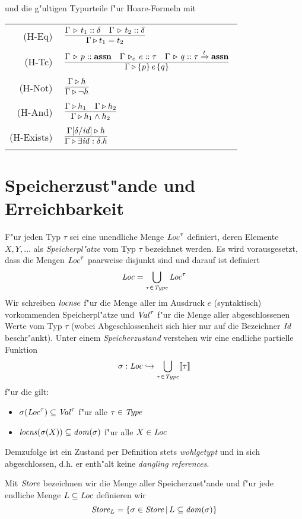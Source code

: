 \documentclass[12pt,a4paper,bigheadings]{scrartcl}
\newcommand{\semantic}[1]{\ensuremath{\llbracket#1\rrbracket}}
\newcommand{\assn}{\ensuremath{\mathbf{assn}}}
\newcommand{\locns}{\name{locns}}
\newcommand{\tto}{\ensuremath{\xrightarrow{t}}}
\newcommand{\RN}[1]{\mbox{{\sc (#1)}}}
\newcommand{\Tje}[3]{#1 \,\tr_e\, #2\cc#3}
\begin{document}
und die g"ultigen Typurteile f"ur Hoare-Formeln mit \\[3mm]
\begin{tabular}{rl}
  \RN{H-Eq} & $\regel{\Tj{\Gamma}{t_1}{\delta} \quad \Tj{\Gamma}{t_2}{\delta}}
                     {\Tjh{\Gamma}{t_1 = t_2}}$ \\[1mm]
  \RN{H-Tc} & $\regel{\Tj{\Gamma}{p}{\assn} \quad \Tje{\Gamma}{e}{\tau} \quad \Tj{\Gamma}{q}{\tau} \tto \assn}
                     {\Tjh{\Gamma}{\triple{p}{e}{q}}}$ \\[1mm]
  \RN{H-Not} & $\regel{\Tjh{\Gamma}{h}}
                      {\Tjh{\Gamma}{\neg h}}$ \\[1mm]
  \RN{H-And} & $\regel{\Tjh{\Gamma}{h_1} \quad \Tjh{\Gamma}{h_2}}
                      {\Tjh{\Gamma}{h_1 \wedge h_2}}$ \\[1mm]
  \RN{H-Exists} & $\regel{\Tjh{\Gamma[\delta/\id]}{h}}
                         {\Tjh{\Gamma}{\exists \id:\delta.h}}$
\end{tabular}


\section{Speicherzust"ande und Erreichbarkeit}

F"ur jeden Typ $\tau$ sei eine unendliche Menge ${\text{\it Loc\/}}^\tau$ definiert, deren Elemente $X,Y,\ldots$
als {\em Speicherpl"atze} vom Typ $\tau$ bezeichnet werden. Es wird vorausgesetzt, dass die Mengen
${\text{\it Loc\/}}^\tau$ paarweise disjunkt sind und darauf ist definiert
\[
  {\text{\it Loc\/}} = \bigcup_{\tau\in{\text{\it Type\/}}} {\text{\it Loc\/}}^\tau
\]
Wir schreiben $\locns{e}$ f"ur die Menge aller im Ausdruck $e$ (syntaktisch) vorkommenden Speicherpl"atze
und ${\text{\it Val\/}}^\tau$ f"ur die Menge aller abgeschlossenen Werte vom Typ $\tau$ (wobei Abgeschlossenheit sich
hier nur auf die Bezeichner ${\text{\it Id\/}}$ beschr"ankt). Unter einem {\em Speicherzustand} verstehen wir eine
endliche partielle Funktion
\[
  \sigma: \Loc \pto \bigcup_{\tau\in\Type} \semantic{\tau}
\]
f"ur die gilt:
\begin{itemize}
  \item $\sigma({\text{\it Loc\/}}^\tau) \subseteq {\text{\it Val\/}}^\tau$ f"ur alle $\tau\in{\text{\it Type\/}}$
  \item $\locns(\sigma(X)) \subseteq \dom{\sigma}$ f"ur alle $X\in{\text{\it Loc\/}}$
\end{itemize}
Demzufolge ist ein Zustand per Definition stets {\em wohlgetypt} und in sich abgeschlossen,
d.h. er enth"alt keine {\em dangling references}.

Mit ${\text{\it Store\/}}$ bezeichnen wir die Menge aller Speicherzust"ande und f"ur jede endliche Menge
$L \subseteq {\text{\it Loc\/}}$ definieren wir
\[
  {\text{\it Store\/}}_L = \{\sigma\in{\text{\it Store\/}}\,|\,L\subseteq{\text{\it dom\/}}(\sigma)\}
\]
\end{document}

